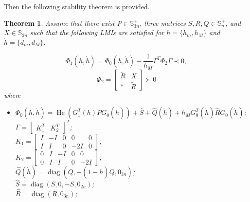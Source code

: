 \documentclass[a4paper]{cas-sc}
\newtheorem{theorem}{Theorem}
\begin{document}
Then the following stability theorem is provided.
\begin{theorem}
  \label{theorem6}
  Assume that there exist $ P \in \mathbb{S}_{3n}^ +  $, three matrices $ S,R,Q \in \mathbb{S}_n^ +  $, and $ X \in \mathbb{S}{_{2n}} $ such that the following LMIs are satisfied for $ h = \{ {h_m},{h_M}\}  $ and $ \dot h = \{ {d_m},{d_M}\}  $.

  \begin{equation}
    \label{eq25}
    {\Phi _1}(h,\dot h) = {\Phi _0}(h,\dot h) - \frac{1}{{{h_M}}}{\Gamma ^T}{\Phi _2}\Gamma  \prec 0,
  \end{equation}
  \begin{equation}
    \label{eq26}
    {\Phi _2} = \left[ {\begin{array}{*{20}{c}}
            {\tilde R} & X          \\
            *          & {\tilde R}
          \end{array}} \right] \succ 0
  \end{equation}
  where
  \begin{itemize}
    \item[]
      $ {\Phi _0}(h,\dot h) = \operatorname{He} \left( {G_1^T(h)P{G_0}(\dot h)} \right) + \hat S + \hat Q(\dot h) + {h_M}G_0^T(\dot h)\hat R{G_0}(\dot h) $;                     \\
      $ \Gamma  = {\left[ {\begin{array}{*{20}{c}}
                {K_1^T} & {K_2^T}
              \end{array}} \right]^T} $;\\
      $ {K_1} = \left[ {\begin{array}{*{20}{c}}
                I & { - I} & 0 & 0       & 0 \\
                I & I      & 0 & { - 2I} & 0
              \end{array}} \right] $;\\
      $ {K_2} = \left[ {\begin{array}{*{20}{c}}
                0 & I & { - I} & 0 & 0       \\
                0 & I & I      & 0 & { - 2I}
              \end{array}} \right] $;\\
      $ \hat Q(\dot h) = \operatorname{diag} \left( {Q, - (1 - \dot h)Q,{0_{3n}}} \right) $;\\
      $ \hat S = \operatorname{diag} \left( {S,0, - S,{0_{2n}}} \right) $;\\
      $ \hat R = \operatorname{diag} \left( {R,{0_{3n}}} \right) $;\\

\end{itemize}
\end{theorem}
\end{document}
